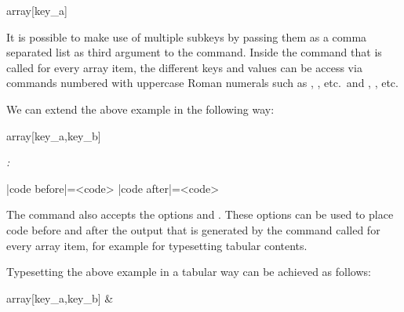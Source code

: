 \documentclass[a4paper]{article}
\begin{document}
{{\begin{codeexamplecolumns}
\begin{itemize}
  \JSONParseArrayMapFunction{\myJSONdata}
    {array}[key_a]{\myJSONitem}
\end{itemize}
\end{codeexamplecolumns}

It is possible to make use of multiple subkeys by passing them as a comma separated list as third argument to the command. Inside the command that is called for every array item, the different keys and values can be access via commands numbered with uppercase Roman numerals such as \macro{\JSONParseArrayKeyI}, \macro{\JSONParseArrayKeyII}, \macro{\JSONParseArrayKeyIII} etc.\ and \macro{\JSONParseArrayValueI}, \macro{\JSONParseArrayValueII}, \macro{\JSONParseArrayValueIII} etc.

We can extend the above example in the following way:

\begin{codeexamplecolumns}
\newcommand{\myJSONitem}{
  \item \emph{\JSONParseArrayValueI :}
    \JSONParseArrayValueII
}

\begin{itemize}
  \JSONParseArrayMapFunction{\myJSONdata}
    {array}[key_a,key_b]{\myJSONitem}
\end{itemize}
\end{codeexamplecolumns}

\begin{macrodef}
|code before|={<code>}
|code after|={<code>}
\end{macrodef}

The \macro{\JSONParseArrayMapFunction} command also accepts the options  and . These options can be used to place code before and after the output that is generated by the command called for every array item, for example for typesetting tabular contents.

Typesetting the above example in a tabular way can be achieved as follows:

\begin{codeexamplecolumns}
\newcommand{\myJSONitem}{
  \JSONParseArrayValueI &
  \JSONParseArrayValueII \\
}

\JSONParseArrayMapFunction[
    code before={
      \begin{tabular}{ c c }
        \textbf{key a} &
        \textbf{key b} \\ \hline
    },
    code after={
      \hline \end{tabular}
    }
  ]{\myJSONdata}
  {array}[key_a,key_b]{\myJSONitem}
\end{codeexamplecolumns}

}}
\end{document}
